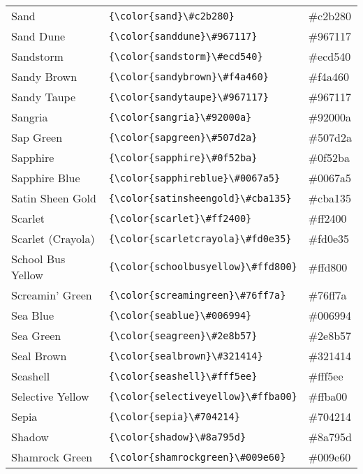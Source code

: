 \documentclass[9.5pt]{article}
\begin{document}
\begin{longtable}{l | l | l}
	Sand & \verb!{\color{sand}\#c2b280}! & {\color{sand}\#c2b280}\\
	Sand Dune & \verb!{\color{sanddune}\#967117}! & {\color{sanddune}\#967117}\\
	Sandstorm & \verb!{\color{sandstorm}\#ecd540}! & {\color{sandstorm}\#ecd540}\\
	Sandy Brown & \verb!{\color{sandybrown}\#f4a460}! & {\color{sandybrown}\#f4a460}\\
	Sandy Taupe & \verb!{\color{sandytaupe}\#967117}! & {\color{sandytaupe}\#967117}\\
	Sangria & \verb!{\color{sangria}\#92000a}! & {\color{sangria}\#92000a}\\
	Sap Green & \verb!{\color{sapgreen}\#507d2a}! & {\color{sapgreen}\#507d2a}\\
	Sapphire & \verb!{\color{sapphire}\#0f52ba}! & {\color{sapphire}\#0f52ba}\\
	Sapphire Blue & \verb!{\color{sapphireblue}\#0067a5}! & {\color{sapphireblue}\#0067a5}\\
	Satin Sheen Gold & \verb!{\color{satinsheengold}\#cba135}! & {\color{satinsheengold}\#cba135}\\
	Scarlet & \verb!{\color{scarlet}\#ff2400}! & {\color{scarlet}\#ff2400}\\
	Scarlet (Crayola) & \verb!{\color{scarletcrayola}\#fd0e35}! & {\color{scarletcrayola}\#fd0e35}\\
	School Bus Yellow & \verb!{\color{schoolbusyellow}\#ffd800}! & {\color{schoolbusyellow}\#ffd800}\\
	Screamin' Green & \verb!{\color{screamingreen}\#76ff7a}! & {\color{screamingreen}\#76ff7a}\\
	Sea Blue & \verb!{\color{seablue}\#006994}! & {\color{seablue}\#006994}\\
	Sea Green & \verb!{\color{seagreen}\#2e8b57}! & {\color{seagreen}\#2e8b57}\\
	Seal Brown & \verb!{\color{sealbrown}\#321414}! & {\color{sealbrown}\#321414}\\
	Seashell & \verb!{\color{seashell}\#fff5ee}! & {\color{seashell}\#fff5ee}\\
	Selective Yellow & \verb!{\color{selectiveyellow}\#ffba00}! & {\color{selectiveyellow}\#ffba00}\\
	Sepia & \verb!{\color{sepia}\#704214}! & {\color{sepia}\#704214}\\
	Shadow & \verb!{\color{shadow}\#8a795d}! & {\color{shadow}\#8a795d}\\
	Shamrock Green & \verb!{\color{shamrockgreen}\#009e60}! & {\color{shamrockgreen}\#009e60}\\

\end{longtable}
\end{document}
